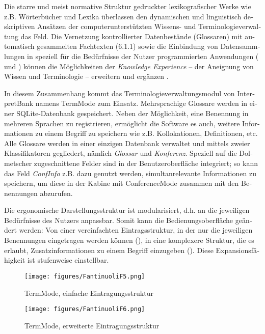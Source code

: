 \documentclass[output=paper]{LSP/langsci}
\begin{document}
\begin{otherlanguage}{ngerman}
Die starre und meist normative Struktur gedruckter lexikografischer Werke wie z.B. Wörterbücher und Lexika überlassen den dynamischen und linguistisch deskriptiven Ansätzen der computerunterstützten Wissens- und Terminologieverwaltung das Feld. Die Vernetzung kontrollierter Datenbestände (Glossaren) mit automatisch gesammelten Fachtexten (6.1.1) sowie die Einbindung von Datensammlungen in speziell für die Bedürfnisse der Nutzer programmierten Anwendungen ( und ) können die Möglichkeiten der \textit{Knowledge Experience} -- der Aneignung von Wissen und Terminologie -- erweitern und ergänzen \citep{Fantinuoli2009}. 

\largerpage
In diesem Zusammenhang kommt das Terminologieverwaltungsmodul von InterpretBank namens TermMode zum Einsatz. Mehrsprachige Glossare werden in einer SQLite-Datenbank gespeichert. Neben der Möglichkeit, eine Benennung in mehreren Sprachen zu registrieren, ermöglicht die Software es auch, weitere Informationen zu einem Begriff zu speichern wie z.B. Kollokationen, Definitionen, etc. Alle Glossare werden in einer einzigen Datenbank verwaltet und mittels zweier Klassifikatoren gegliedert, nämlich \textit{Glossar} und \textit{Konferenz}. Speziell auf die Dolmetscher zugeschnittene Felder sind in der Benutzeroberfläche integriert; so kann das Feld \textit{ConfInfo} z.B. dazu genutzt werden, simultanrelevante Informationen zu speichern, um diese in der Kabine mit ConferenceMode zusammen mit den Benennungen abzurufen.

Die ergonomische Darstellungsstruktur ist modularisiert, d.h. an die jeweiligen Bedürfnisse des Nutzers anpassbar. Somit kann die Bedienungsoberfläche geändert werden: Von einer vereinfachten Eintragsstruktur, in der nur die jeweiligen Benennungen eingetragen werden können (), in eine komplexere Struktur, die es erlaubt, Zusatzinformationen zu einem Begriff einzugeben (). Diese Expansionsfähigkeit ist stufenweise einstellbar. 

\begin{figure}
\texttt{[image: figures/FantinuoliF5.png]}
\caption{TermMode, einfache Eintragungsstruktur}
\label{fig:fantinuoli:5}
\end{figure} 

\begin{figure}
\texttt{[image: figures/FantinuoliF6.png]}
\caption{TermMode, erweiterte Eintragungsstruktur}
\label{fig:fantinuoli:6}
\end{figure} 


\end{otherlanguage}
\end{document}
